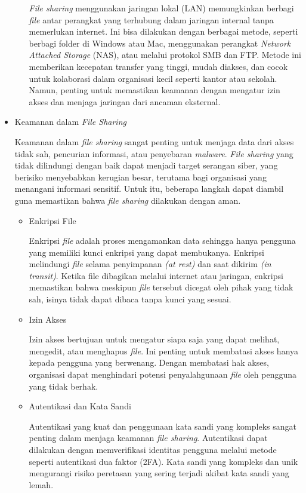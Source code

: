 \documentclass[12pt]{article}
\begin{document}
\begin{itemize}
\begin{itemize}
        \textit{File sharing} menggunakan jaringan lokal (LAN) memungkinkan berbagi \textit{file} antar perangkat yang terhubung dalam jaringan internal tanpa memerlukan internet. Ini bisa dilakukan dengan berbagai metode, seperti berbagi folder di Windows atau Mac, menggunakan perangkat \textit{Network Attached Storage} (NAS), atau melalui protokol SMB dan FTP. Metode ini memberikan kecepatan transfer yang tinggi, mudah diakses, dan cocok untuk kolaborasi dalam organisasi kecil seperti kantor atau sekolah. Namun, penting untuk memastikan keamanan dengan mengatur izin akses dan menjaga jaringan dari ancaman eksternal.
    \end{itemize}
    \item Keamanan dalam \textit{File Sharing}

    Keamanan dalam \textit{file sharing} sangat penting untuk menjaga data dari akses tidak sah, pencurian informasi, atau penyebaran \textit{malware}. \textit{File sharing} yang tidak dilindungi dengan baik dapat menjadi target serangan siber, yang berisiko menyebabkan kerugian besar, terutama bagi organisasi yang menangani informasi sensitif. Untuk itu, beberapa langkah dapat diambil guna memastikan bahwa \textit{file sharing} dilakukan dengan aman.
    \begin{itemize}
        \item Enkripsi File

        Enkripsi \textit{file} adalah proses mengamankan data sehingga hanya pengguna yang memiliki kunci enkripsi yang dapat membukanya. Enkripsi melindungi\textit{ file }selama penyimpanan \textit{(at rest)} dan saat dikirim \textit{(in transit)}. Ketika file dibagikan melalui internet atau jaringan, enkripsi memastikan bahwa meskipun \textit{file} tersebut dicegat oleh pihak yang tidak sah, isinya tidak dapat dibaca tanpa kunci yang sesuai.
        \item Izin Akses

        Izin akses bertujuan untuk mengatur siapa saja yang dapat melihat, mengedit, atau menghapus \textit{file}. Ini penting untuk membatasi akses hanya kepada pengguna yang berwenang. Dengan membatasi hak akses, organisasi dapat menghindari potensi penyalahgunaan \textit{file} oleh pengguna yang tidak berhak.

        \item Autentikasi dan Kata Sandi

        Autentikasi yang kuat dan penggunaan kata sandi yang kompleks sangat penting dalam menjaga keamanan \textit{file sharing}. Autentikasi dapat dilakukan dengan memverifikasi identitas pengguna melalui metode seperti autentikasi dua faktor (2FA). Kata sandi yang kompleks dan unik mengurangi risiko peretasan yang sering terjadi akibat kata sandi yang lemah.


\end{itemize}
\end{itemize}
\end{document}
